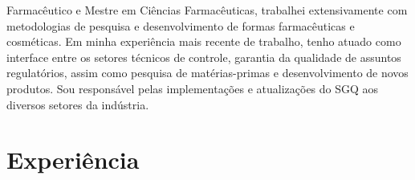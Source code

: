 
\begin{center}
    \small 
        Farmacêutico e Mestre em Ciências Farmacêuticas, trabalhei extensivamente com metodologias de pesquisa e
        desenvolvimento de formas farmacêuticas e cosméticas.
        Em minha experiência mais recente de trabalho, tenho atuado como interface entre os setores técnicos
        de controle, garantia da qualidade de assuntos regulatórios, assim como pesquisa de matérias-primas e
        desenvolvimento de novos produtos.
        Sou responsável pelas implementações e atualizações do SGQ aos diversos setores da indústria.

\end{center}
    



\section{Experiência}



